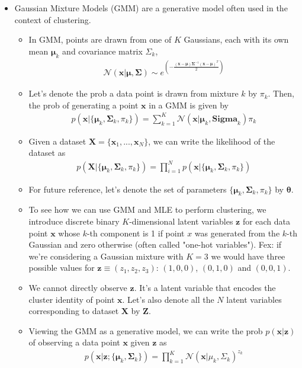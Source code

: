 \documentclass[norsk,a4paper,11pt]{article}
\begin{document}
\begin{itemize}
	\item Gaussian Mixture Models (GMM) are a generative model often used in the context of clustering. 
	\begin{itemize}
		\item In GMM, points are drawn from one of $K$ Gaussians, each with its own mean $\bm{\mu}_k$ and covariance matrix $\Sigma_k$,
		\begin{align}
			\mathcal{N(\bm{x}|\bm{\mu},\bm{\Sigma})} \sim e^{( - \frac{(\bm{x}-\bm{\mu}) \bm{\Sigma}^{-1} (\bm{x} - \bm{\mu})^T}{2} )}
		\end{align}
		\item Let's denote the prob a data point is drawn from mixture $k$ by $\pi_k$. Then, the prob of generating a point $\bm{x}$ in a GMM is given by 
		\begin{align}
			p(\bm{x} | \{ \bm{\mu}_k, \bm{\Sigma}_k, \pi_k \}) = \sum_{k=1}^K \mathcal{N} (\bm{x}|\bm{\mu}_k, \bm{Sigma}_k) \pi_k
		\end{align}
		\item Given a dataset $\bm{X} = \{ \bm{x}_1, ..., \bm{x}_N \}$, we can write the likelihood of the dataset as
		\begin{align}
			p(\bm{X} | \{ \bm{\mu}_k, \bm{\Sigma}_k, \pi_k \}) = \prod_{i=1}^N p(\bm{x} | \{ \bm{\mu}_k, \bm{\Sigma}_k, \pi_k \})
		\end{align}
		\item For future reference, let's denote the set of parameters $\{ \bm{\mu}_k, \bm{\Sigma}_k, \pi_k  \}$ by $\bm{\theta}$.
		\item To see how we can use GMM and MLE to perform clustering, we introduce discrete binary $K$-dimensional latent variables $\bm{z}$ for each data point $\bm{x}$ whose $k$-th component is 1 if point $x$ was generated from the $k$-th Gaussian and zero otherwise (often called "one-hot variables"). Fex: if we're considering a Gaussian mixture with $K=3$ we would have three possible values for $\bm{z} \equiv (z_1, z_2, z_3)$: $(1,0,0)$, $(0,1,0)$ and $(0,0,1)$. 
		\item We cannot directly observe $\bm{z}$. It's a latent variable that encodes the cluster identity of point $\bm{x}$. Let's also denote all the $N$ latent variables corresponding to dataset $\bm{X}$ by $\bm{Z}$.
		\item Viewing the GMM as a generative model, we can write the prob $p(\bm{x}|\bm{z})$ of observing a data point $\bm{x}$ given $\bm{z}$ as 
		\begin{align}
			p(\bm{x}|\bm{z}; \{ \bm{\mu}_k, \bm{\Sigma}_k \}) = \prod_{k=1}^K \mathcal{N} (\bm{x}| \mu_k, \Sigma_k)^{z_k}

\end{align}
\end{itemize}
\end{itemize}
\end{document}
